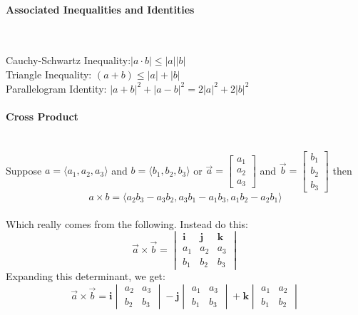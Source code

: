 \documentclass{article}
\begin{document}
\paragraph{Associated Inequalities and Identities}\mbox{}\\
\begin{onehalfspace}
Cauchy-Schwartz Inequality:\hspace{1cm}\(|a \cdot b| \leq |a||b|\)\\
Triangle Inequality: \hspace{1cm}\((a + b) \leq |a| + |b|\)\\
Parallelogram Identity: \hspace{1cm} \(|a+b|^2 + |a-b|^2 = 2|a|^2 +  2|b|^2\)
\end{onehalfspace}

\paragraph{Cross Product}\mbox{}\\
Suppose \(a = \langle a_1, a_2, a_3 \rangle\) and \(b = \langle b_1, b_2, b_3 \rangle\) 
or \( \vec{a} = \begin{bmatrix} a_1 \\ a_2 \\ a_3 \end{bmatrix} \) and \( \vec{b} = \begin{bmatrix} b_1 \\ b_2 \\ b_3 \end{bmatrix} \)
then\\
\begin{equation}
    \label{corss product}
    a \times b = \langle a_2b_3 - a_3b_2, a_3b_1 - a_1b_3, a_1b_2 - a_2b_1 \rangle
\end{equation}\\
Which really comes from the following. Instead do this:\\
\[ 
\vec{a} \times \vec{b} = 
\begin{vmatrix}
\mathbf{i} & \mathbf{j} & \mathbf{k} \\
a_1 & a_2 & a_3 \\
b_1 & b_2 & b_3
\end{vmatrix} 
\]
Expanding this determinant, we get:
\[ 
\vec{a} \times \vec{b} = \mathbf{i}
\begin{vmatrix}
a_2 & a_3 \\
b_2 & b_3 
\end{vmatrix}
- \mathbf{j}
\begin{vmatrix}
a_1 & a_3 \\
b_1 & b_3
\end{vmatrix}
+ \mathbf{k}
\begin{vmatrix}
a_1 & a_2 \\
b_1 & b_2
\end{vmatrix}
\]
\end{document}
